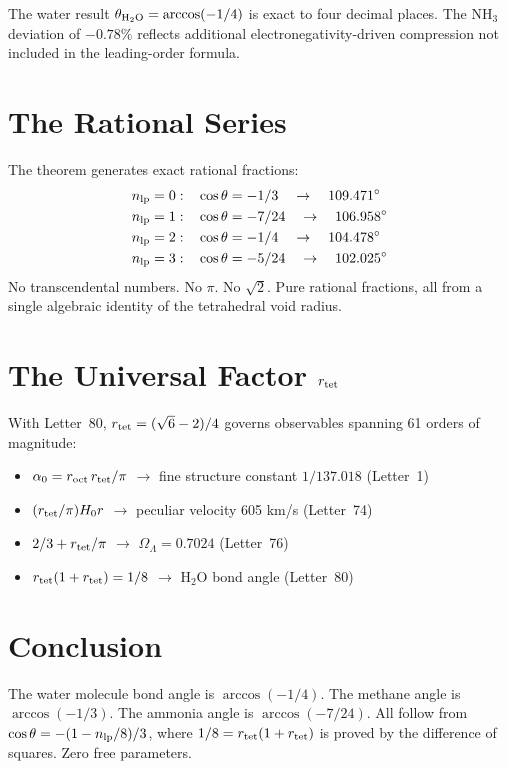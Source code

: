 \documentclass[aps,prl,twocolumn,showpacs,superscriptaddress]{revtex4-2}
\begin{document}
The water result $\theta_{\rm H_2O} = \arccos(-1/4)$ is exact to four 
decimal places. The NH$_3$ deviation of $-0.78\%$ reflects additional 
electronegativity-driven compression not included in the leading-order 
formula.

\section{The Rational Series}

The theorem generates exact rational fractions:
\begin{align}
n_{\rm lp} = 0:&\quad \cos\theta = -1/3 \quad\to\quad 109.471^\circ\\
n_{\rm lp} = 1:&\quad \cos\theta = -7/24 \quad\to\quad 106.958^\circ\\
n_{\rm lp} = 2:&\quad \cos\theta = -1/4 \quad\to\quad 104.478^\circ\\
n_{\rm lp} = 3:&\quad \cos\theta = -5/24 \quad\to\quad 102.025^\circ
\end{align}
No transcendental numbers. No $\pi$. No $\sqrt{2}$. Pure rational fractions,
all from a single algebraic identity of the tetrahedral void radius.

\section{The Universal Factor $r_{\rm tet}$}

With Letter~80, $r_{\rm tet} = (\sqrt{6}-2)/4$ governs observables spanning
61 orders of magnitude:
\begin{itemize}
\item $\alpha_0 = r_{\rm oct}\,r_{\rm tet}/\pi$ $\to$ fine structure 
constant $1/137.018$ (Letter~1)
\item $(r_{\rm tet}/\pi)H_0 r$ $\to$ peculiar velocity 605 km/s (Letter~74)
\item $2/3 + r_{\rm tet}/\pi$ $\to$ $\Omega_\Lambda = 0.7024$ (Letter~76)
\item $r_{\rm tet}(1+r_{\rm tet}) = 1/8$ $\to$ H$_2$O bond angle (Letter~80)
\end{itemize}

\section{Conclusion}

The water molecule bond angle is $\arccos(-1/4)$. The methane angle is 
$\arccos(-1/3)$. The ammonia angle is $\arccos(-7/24)$. All follow from 
$\cos\theta = -(1-n_{\rm lp}/8)/3$, where $1/8 = r_{\rm tet}(1+r_{\rm tet})$ 
is proved by the difference of squares. Zero free parameters.
\end{document}
